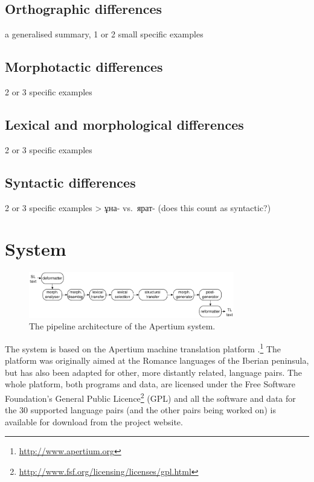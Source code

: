 \documentclass[11pt]{article}
\begin{document}
\subsection{Orthographic differences}
a generalised summary, 1 or 2 small specific examples
\subsection{Morphotactic differences}
2 or 3 specific examples
\subsection{Lexical and morphological differences}
2 or 3 specific examples
\subsection{Syntactic differences}
2 or 3 specific examples
> ұна- vs.\ ярат- (does this count as syntactic?)

\section{System}
\label{sec:sys}

\begin{figure}[htbp]
\begin{center}
 \includegraphics[width=0.8\textwidth]{architecture.pdf}
\end{center}
\caption{The pipeline architecture of the Apertium system.}
\label{fig:modules}
\end{figure}

The system is based on the Apertium machine translation 
platform \citep{apertium/2011}.\footnote{\url{http://www.apertium.org}} The 
platform was originally aimed at the Romance languages of the Iberian peninsula, but has also been adapted for 
other, more distantly related, language pairs.
The whole platform, both programs and data, are licensed under the Free Software Foundation's General Public 
Licence\footnote{\url{http://www.fsf.org/licensing/licenses/gpl.html}} (GPL) and all the software and data for the 
30 supported language pairs (and the other pairs being worked on) is available for download from the project 
website.
\end{document}
